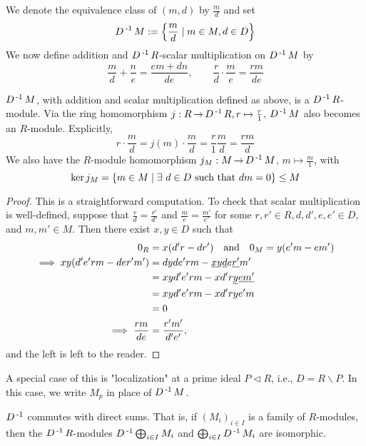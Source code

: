 \documentclass[11pt]{book}
\theoremstyle{definition}   \newtheorem{defn}[counter]{Definition} %
\newcommand{\bs}{\backslash}   \newcommand{\A}{\mathcal{A}}   \newcommand{\sy}{\textnormal{Syl}}   \newcommand{\size}[1]{\left| #1 \right|}
\DeclareMathOperator{\ra}{\rightarrow}   \DeclareMathOperator{\Poly}{\mathbf{P}}   \DeclareMathOperator{\spn}{\textnormal{span}}   \DeclareMathOperator{\aut}{\textnormal{Aut}}
\newcommand{\vs}{\vspace{8pt}}
\numberwithin{counter}{chapter}
\begin{document}
We denote the equivalence class of $(m,d)$ by $\frac{m}{d}$ and set
	\[ D\operatorname{^{-1}} M := \left\{\frac{m}{d} \mid m \in M, d \in D \right\} \]
We now define addition and $D\operatorname{^{-1}} R$-scalar multiplication on $D\operatorname{^{-1}} M$ by
	\[\frac{m}{d} + \frac{n}{e} = \frac{em + dn}{de}, \qquad \frac{r}{d} \cdot \frac{m}{e} = \frac{rm}{de} \]

\vs

\begin{lemma}
$D\operatorname{^{-1}} M$, with addition and scalar multiplication defined as above, is a $D\operatorname{^{-1}} R$-module. Via the ring homomorphism $j : R \ra D\inv R, r \mapsto \frac{r}{1}$, $D\operatorname{^{-1}} M$ also becomes an $R$-module. Explicitly,
	\[r \cdot \frac{m}{d} = j(m) \cdot \frac{m}{d} = \frac{r}{1} \frac{m}{d} = \frac{rm}{d} \]
We also have the $R$-module homomorphism $j_M : M \ra D\inv M$, $m \mapsto \frac{m}{1}$, with
	\[\ker j_M = \{m \in M \mid \exists \ d \in D \textnormal{ such that } dm = 0 \} \leq M \]
\end{lemma}

\begin{proof}
This is a straightforward computation. To check that scalar multiplication is well-defined, suppose that $\frac{r}{d} = \frac{r'}{d'}$ and $\frac{m}{e} = \frac{m'}{e'}$ for some $r,r' \in R, d,d',e,e' \in D$, and $m,m' \in M$. Then there exist $x,y \in D$ such that
\begin{align*}
0_R &= x(d'r-dr') \quad \textnormal{and} \quad 0_M = y(e'm-em') \\
\implies xy(d'e'rm - der'm') &= dyde'rm - \underline{x} y \underline{d} e \underline{r'} m' \\
&= xyd'e'rm - xd'r\underline{y} \underline{e} \underline{m'} \\
&= xyd'e'rm - xd'rye'm \\
&= 0 \\
\implies \frac{rm}{de} &= \frac{r'm'}{d'e'},
\end{align*}
and the left is left to the reader.
\end{proof}

\vs

A special case of this is "localization" at a prime ideal $P \vartriangleleft R$, i.e., $D = R \bs P$. In this case, we write $M_p$ in place of $D\operatorname{^{-1}} M$.

\vs

\begin{lemma}
$D\operatorname{^{-1}}$ commutes with direct sums. That is, if $(M_i)_{i \in I}$ is a family of $R$-modules, then the $D\operatorname{^{-1}} R$-modules $D\operatorname{^{-1}} \bigoplus_{i \in I} M_i$ and $\bigoplus_{i \in I} D\operatorname{^{-1}} M_i$ are isomorphic.
\end{lemma}
\end{document}
